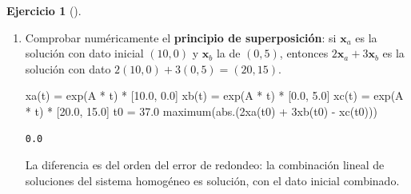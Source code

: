 \documentclass[
  spanish,
  a4paper,
]{scrreport}
\newenvironment{Shaded}{\begin{snugshade}}{\end{snugshade}}
\newcommand{\FloatTok}[1]{\textcolor[rgb]{0.68,0.00,0.00}{#1}}
\newcommand{\FunctionTok}[1]{\textcolor[rgb]{0.28,0.35,0.67}{#1}}
\newcommand{\NormalTok}[1]{\textcolor[rgb]{0.00,0.23,0.31}{#1}}
\newcommand{\OperatorTok}[1]{\textcolor[rgb]{0.37,0.37,0.37}{#1}}
\theoremstyle{definition}
\newtheorem{exercise}{Ejercicio}[chapter]
\theoremstyle{remark}
\begin{document}
\begin{exercise}[]
\begin{enumerate}
\begin{tcolorbox}
  $\left[\begin{smallmatrix}\frac{e^{- \frac{t}{50}}}{2} + \frac{e^{- \frac{3 t}{50}}}{2} & \frac{e^{- \frac{t}{50}}}{4} - \frac{e^{- \frac{3 t}{50}}}{4}\\e^{- \frac{t}{50}} - e^{- \frac{3 t}{50}} & \frac{e^{- \frac{t}{50}}}{2} + \frac{e^{- \frac{3 t}{50}}}{2}\end{smallmatrix}\right]$

  El tanque 2 llega a acumular unos \textbf{3.2 kg} de sal hacia
  \(t\approx 27\) min y después la pierde progresivamente.

  \end{tcolorbox}
\item
  Comprobar numéricamente el \textbf{principio de superposición}: si
  \(\mathbf{x}_a\) es la solución con dato inicial \((10,0)\) y
  \(\mathbf{x}_b\) la de \((0,5)\), entonces
  \(2\mathbf{x}_a + 3\mathbf{x}_b\) es la solución con dato
  \(2(10,0)+3(0,5) = (20,15)\).

  \begin{tcolorbox}[enhanced jigsaw, arc=.35mm, bottomrule=.15mm, bottomtitle=1mm, breakable, colback=white, colbacktitle=quarto-callout-tip-color!10!white, colframe=quarto-callout-tip-color-frame, coltitle=black, left=2mm, leftrule=.75mm, opacityback=0, opacitybacktitle=0.6, rightrule=.15mm, title=\textcolor{quarto-callout-tip-color}{\faLightbulb}\hspace{0.5em}{Solución}, titlerule=0mm, toprule=.15mm, toptitle=1mm]

\begin{Shaded}
\begin{Highlighting}[]
\FunctionTok{xa}\NormalTok{(t) }\OperatorTok{=} \FunctionTok{exp}\NormalTok{(A }\OperatorTok{*}\NormalTok{ t) }\OperatorTok{*}\NormalTok{ [}\FloatTok{10.0}\NormalTok{, }\FloatTok{0.0}\NormalTok{]}
\FunctionTok{xb}\NormalTok{(t) }\OperatorTok{=} \FunctionTok{exp}\NormalTok{(A }\OperatorTok{*}\NormalTok{ t) }\OperatorTok{*}\NormalTok{ [}\FloatTok{0.0}\NormalTok{, }\FloatTok{5.0}\NormalTok{]}
\FunctionTok{xc}\NormalTok{(t) }\OperatorTok{=} \FunctionTok{exp}\NormalTok{(A }\OperatorTok{*}\NormalTok{ t) }\OperatorTok{*}\NormalTok{ [}\FloatTok{20.0}\NormalTok{, }\FloatTok{15.0}\NormalTok{]}
\NormalTok{t0 }\OperatorTok{=} \FloatTok{37.0}
\FunctionTok{maximum}\NormalTok{(}\FunctionTok{abs}\NormalTok{.(}\FloatTok{2}\FunctionTok{xa}\NormalTok{(t0) }\OperatorTok{+} \FloatTok{3}\FunctionTok{xb}\NormalTok{(t0) }\OperatorTok{{-}} \FunctionTok{xc}\NormalTok{(t0)))}
\end{Highlighting}
\end{Shaded}

\begin{verbatim}
0.0
\end{verbatim}

  La diferencia es del orden del error de redondeo: la combinación
  lineal de soluciones del sistema homogéneo es solución, con el dato
  inicial combinado.

  \end{tcolorbox}
\end{enumerate}

\end{exercise}
\end{document}
